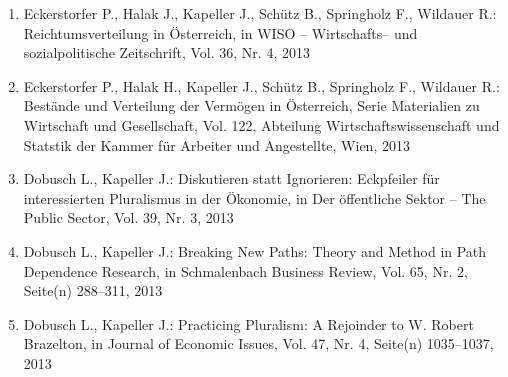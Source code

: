 \begin{enumerate}
	 \item Eckerstorfer P., Halak J., Kapeller J., Schütz B., Springholz F., Wildauer R.: Reichtumsverteilung in Österreich, in WISO -- Wirtschafts-- und sozialpolitische Zeitschrift, Vol. 36, Nr. 4, 2013
	 \item Eckerstorfer P., Halak H., Kapeller J., Schütz B., Springholz F., Wildauer R.: Bestände und Verteilung der Vermögen in Österreich, Serie Materialien zu Wirtschaft und Gesellschaft, Vol. 122, Abteilung Wirtschaftswissenschaft und Statstik der Kammer für Arbeiter und Angestellte, Wien, 2013
	 \item Dobusch L., Kapeller J.: Diskutieren statt Ignorieren: Eckpfeiler für interessierten Pluralismus in der Ökonomie, in Der öffentliche Sektor -- The Public Sector, Vol. 39, Nr. 3, 2013
	 \item Dobusch L., Kapeller J.: Breaking New Paths: Theory and Method in Path Dependence Research, in Schmalenbach Business Review, Vol. 65, Nr. 2, Seite(n) 288--311, 2013
	 \item Dobusch L., Kapeller J.: Practicing Pluralism: A Rejoinder to W. Robert Brazelton, in Journal of Economic Issues, Vol. 47, Nr. 4, Seite(n) 1035--1037, 2013
\end{enumerate}
